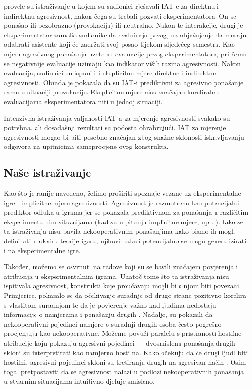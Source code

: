 \documentclass[a4paper, 12pt]{report}
\begin{document}
\citet{richetin2010predictive} provele su istraživanje u kojem su sudionici
rješavali IAT-e za direktnu i indirektnu agresivnost, nakon čega su trebali
pozvati eksperimentatora. On se ponašao ili bezobrazno (provokacija) ili
neutralno. Nakon te interakcije, drugi je eksperimentator zamolio sudionike da
evaluiraju prvog, uz objašnjenje da moraju odabrati asistente koji će zadržati
svoj posao tijekom sljedećeg semestra. Kao mjera agresivnog ponašanja uzete su evaluacije
prvog eksperimentatora, pri čemu se negativnije evaluacije uzimaju kao indikator
viših razina agresivnosti. Nakon evaluacija, sudionici su ispunili i
eksplicitne mjere direktne i indirektne agresivnosti. Obrada je pokazala da su
IAT-i prediktivni za agresivno ponašanje samo u situaciji provokacije.
Eksplicitne mjere nisu značajno korelirale s evaluacijama eksperimentatora niti
u jednoj situaciji.

Intenzivna istraživanja valjanosti IAT-a za mjerenje agresivnosti svakako su
potrebna, ali dosadašnji rezultati su podosta ohrabrujući. IAT za mjerenje
agresivnosti mogao bi biti posebno značajan zbog snažne sklonosti iskrivljavanju
odgovora na upitnicima samoprocjene ovog konstrukta. 

\subsection{Naše istraživanje}

Kao što je ranije navedeno, želimo proširiti spoznaje vezane uz eksperimentalne
igre i implicitne mjere agresivnosti.
Agresivnost je razmotrena kao potencijalni prediktor odluka u 
igrama  jer se pokazala
prediktivnom za ponašanja u različitim eksperimentalnim situacijama
(kad su u pitanju implicitne mjere, npr. 
\citealp{richetin2010predictive, banse2015predicting}). 
Iako se ta istraživanja nisu bavila nekooperativnim ponašanjima kako bismo ih
mogli definirati u okviru teorije igara, njihovi nalazi potencijalno se mogu
generalizirati i na eksperimentalne igre.

Također,  možemo se osvrnuti na radove koji su se
bavili značajem povjerenja i atribucija u eksperimentalnim igrama.
Unatoč tome što ta istraživanja nisu ispitivala agresivnost, konstrukti koje proučavaju mogli
bi s njom biti povezani.
Primjerice, pokazalo se da očekivanje suradnje od druge strane pozitivno korelira s vlastitom
suradnjom te da je povjerenje važno kad ljudima nedostaju informacije o
namjerama i ponašanju drugih \citep{balliet2013trust, vancoop}. Nadalje,
\citet{kelley1970inference} su pokazali da nekooperativni pojedinci namjere o
suradnji drugih osoba često pogrešno procjenjuju kao nekooperativne.
Možemo povući paralelu s pristranosti hostilne atribucije koju pokazuju agresivni
pojedinci --- dvosmislena ponašanja drugih skloni su interpretirati kao namjerno
hostilna. Kako očekuju da će drugi ljudi biti hostilni, agresivni pojedinci
skloni su tretiranju drugih na agresivan način \citep{larsbuss}. 
Osim toga, pretpostaviti da se agresivnost nalazi u podlozi nekooperativnih
ponašanja u stvarnim situacijama intuitivno djeluje smisleno.
\end{document}
